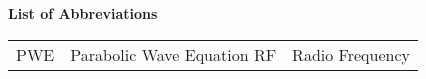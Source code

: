 \noindent\Large{\bf{List of Abbreviations}}

\vspace{24pt}

\small\normalsize

\begin{supertabular}{ll}
PWE & Parabolic Wave Equation
RF & Radio Frequency
\end{supertabular}
